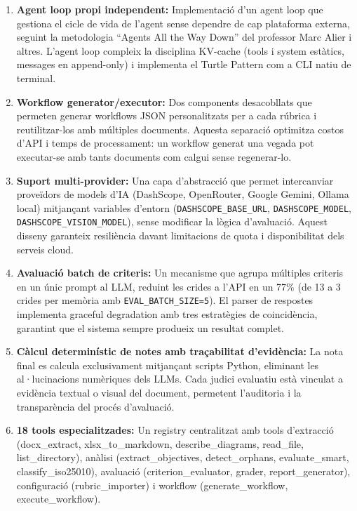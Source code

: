 \documentclass[12pt,a4paper,twoside]{report}
\begin{document}
\begin{enumerate}
    \item \textbf{Agent loop propi independent:} Implementaci\'o d'un agent loop que gestiona el cicle de vida de l'agent sense dependre de cap plataforma externa, seguint la metodologia ``Agents All the Way Down'' \cite{alier2025} del professor Marc Alier i altres. L'agent loop compleix la disciplina KV-cache (tools i system est\`atics, messages en append-only) i implementa el Turtle Pattern com a CLI natiu de terminal.

    \item \textbf{Workflow generator/executor:} Dos components desacobllats que permeten generar workflows JSON personalitzats per a cada r\'ubrica i reutilitzar-los amb m\'ultiples documents. Aquesta separaci\'o optimitza costos d'API i temps de processament: un workflow generat una vegada pot executar-se amb tants documents com calgui sense regenerar-lo.

    \item \textbf{Suport multi-provider:} Una capa d'abstracci\'o que permet intercanviar prove\"idors de models d'IA (DashScope, OpenRouter, Google Gemini, Ollama local) mitjan\c{c}ant variables d'entorn (\texttt{DASHSCOPE\_BASE\_URL}, \texttt{DASHSCOPE\_MODEL},\\ \texttt{DASHSCOPE\_VISION\_MODEL}), sense modificar la l\`ogica d'avaluaci\'o. Aquest disseny garanteix resili\`encia davant limitacions de quota i disponibilitat dels serveis cloud.

    \item \textbf{Avaluaci\'o batch de criteris:} Un mecanisme que agrupa m\'ultiples criteris en un \'unic prompt al LLM, reduint les crides a l'API en un 77\% (de 13 a 3 crides per mem\`oria amb \texttt{EVAL\_BATCH\_SIZE=5}). El parser de respostes implementa graceful degradation amb tres estrat\`egies de coincid\`encia, garantint que el sistema sempre produeix un resultat complet.

    \item \textbf{C\`alcul determin\'istic de notes amb tra\c{c}abilitat d'evid\`encia:} La nota final es calcula exclusivament mitjan\c{c}ant scripts Python, eliminant les al·lucinacions num\`eriques dels LLMs. Cada judici evaluatiu est\`a vinculat a evid\`encia textual o visual del document, permetent l'auditoria i la transpar\`encia del proc\'es d'avaluaci\'o.

    \item \textbf{18 tools especialitzades:} Un registry centralitzat amb tools d'extracci\'o (docx\_extract, xlsx\_to\_markdown, describe\_diagrams, read\_file, list\_directory), an\`alisi (extract\_objectives, detect\_orphans, evaluate\_smart, classify\_iso25010), avaluaci\'o (criterion\_evaluator, grader, report\_generator), configuraci\'o (rubric\_importer) i workflow (generate\_workflow, execute\_workflow).


\end{enumerate}
\end{document}
